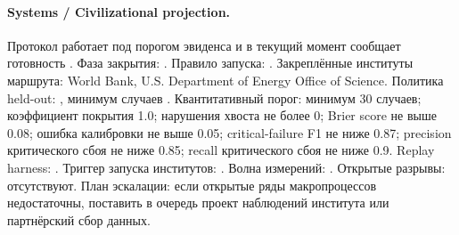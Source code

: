 \paragraph{Systems / Civilizational projection.}
Протокол  работает под порогом эвиденса  и в текущий момент сообщает готовность .
Фаза закрытия: . Правило запуска: .
Закреплённые институты маршрута: World Bank, \allowbreak U.S. Department of Energy Office of Science.
Политика held-out: , минимум случаев .
Квантитативный порог: минимум 30 случаев; коэффициент покрытия 1.0; нарушения хвоста не более 0; Brier score не выше 0.08; ошибка калибровки не выше 0.05; critical-failure F1 не ниже 0.87; precision критического сбоя не ниже 0.85; recall критического сбоя не ниже 0.9.
Replay harness: .
Триггер запуска институтов: . Волна измерений: .
Открытые разрывы: отсутствуют.
План эскалации: если открытые ряды макропроцессов недостаточны, поставить в очередь проект наблюдений института или партнёрский сбор данных.

